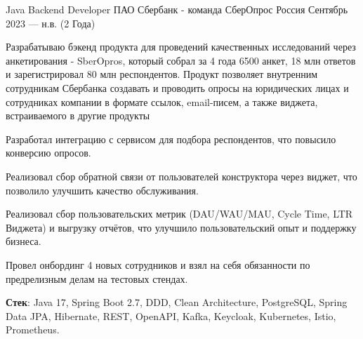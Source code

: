 

\begin{cventries}
\cventry
  {Java Backend Developer} %
  {ПАО Сбербанк - команда СберОпрос} %
  {Россия} %
  {Сентябрь 2023 — н.в. (2 Года)} %
  {
    \begin{cvitems} %
      \item {Разрабатываю бэкенд продукта для проведений качественных исследований через анкетирования - SberOpros, который собрал за 4 года 6500 анкет, 
      18 млн ответов и зарегистрировал 80 млн респондентов. Продукт позволяет внутренним сотрудникам Сбербанка создавать и проводить опросы на юридических лицах и сотрудниках 
      компании в формате ссылок, email-писем, а также виджета, встраиваемого в другие продукты}
      \item {Разработал интеграцию с сервисом для подбора респондентов, что повысило конверсию опросов.}
      \item {Реализовал сбор обратной связи от пользователей конструктора через виджет, что позволило улучшить качество обслуживания.}
      \item {Реализовал сбор пользовательских метрик (DAU/WAU/MAU, Cycle Time, LTR Виджета) и выгрузку отчётов, что улучшило пользовательский опыт и поддержку бизнеса.}
      \item {Провел онбординг 4 новых сотрудников и взял на себя обязанности по предрелизным делам на тестовых стендах.}
      \item {\textbf{Стек}: Java 17, Spring Boot 2.7, DDD, Clean Architecture, PostgreSQL, Spring Data JPA, Hibernate, REST, OpenAPI, Kafka, Keycloak, Kubernetes, Istio, Prometheus.}
    \end{cvitems}
  }
\end{cventries}





